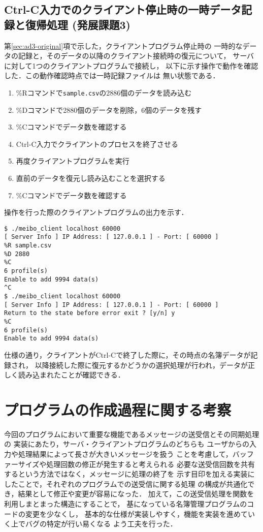 \subsection{Ctrl-C入力でのクライアント停止時の一時データ記録と復帰処理 (発展課題3)}
第\ref{sec:ad3-original}項で示した，クライアントプログラム停止時の
一時的なデータの記録と，そのデータの以降のクライアント接続時の復元について，
サーバに対して1つのクライアントプログラムで接続し，
以下に示す操作で動作を確認した．この動作確認時点では一時記録ファイルは
無い状態である．
\begin{enumerate}
  \item \%Rコマンドで\verb|sample.csv|の2886個のデータを読み込む
  \item \%Dコマンドで2880個のデータを削除，6個のデータを残す
  \item \%Cコマンドでデータ数を確認する
  \item Ctrl-C入力でクライアントのプロセスを終了させる
  \item 再度クライアントプログラムを実行
  \item 直前のデータを復元し読み込むことを選択する
  \item \%Cコマンドでデータ数を確認する
\end{enumerate}

操作を行った際のクライアントプログラムの出力を示す．
\begin{Verbatim}[numbers=none, numbersep=6pt, frame=single,
  fontsize=\small, baselinestretch=0.8]
$ ./meibo_client localhost 60000
[ Server Info ] IP Address: [ 127.0.0.1 ] - Port: [ 60000 ]
%R sample.csv
%D 2880
%C
6 profile(s)
Enable to add 9994 data(s)
^C
$ ./meibo_client localhost 60000
[ Server Info ] IP Address: [ 127.0.0.1 ] - Port: [ 60000 ]
Return to the state before error exit ? [y/n] y
%C
6 profile(s)
Enable to add 9994 data(s)
\end{Verbatim}
仕様の通り，クライアントがCtrl-Cで終了した際に，その時点の名簿データが記録され，
以降接続した際に復元するかどうかの選択処理が行われ，データが正しく読み込まれたことが確認できる．
\section{プログラムの作成過程に関する考察}
今回のプログラムにおいて重要な機能であるメッセージの送受信とその同期処理の
実装にあたり，サーバ・クライアントプログラムのどちらも
ユーザからの入力や処理結果によって長さが大きいメッセージを扱う
ことを考慮して，バッファーサイズや処理回数の修正が発生すると考えられる
必要な送受信回数を共有するという方法ではなく，メッセージに処理の終了を
示す目印を加える実装にしたことで，それぞれのプログラムでの送受信に関する処理
の構成が共通化でき，結果として修正や変更が容易になった．
加えて，この送受信処理を関数を利用しまとまった構造にすることで，
基になっている名簿管理プログラムのコードの変更を少なくし，
基本的な仕様が実装しやすく，機能を実装を進めていく上でバグの特定が行い易くなる
よう工夫を行った．

